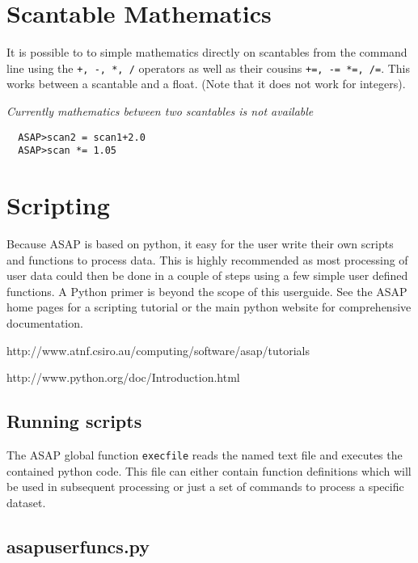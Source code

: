 \documentclass[11pt]{article}
\newcommand{\cmd}[1]{{\tt #1}}
\begin{document}
\section{Scantable Mathematics}

It is possible to to simple mathematics
directly on scantables from the command line using the \cmd{+, -, *,
/} operators as well as their cousins \cmd{+=, -= *=, /=}. This works
between a scantable and a float. (Note that it does
not work for integers).

{\em Currently mathematics between two scantables is not available }

\begin{verbatim}
  ASAP>scan2 = scan1+2.0
  ASAP>scan *= 1.05
\end{verbatim}

\section{Scripting}

Because ASAP is based on python, it easy for the user
write their own scripts and functions to process data. This is highly
recommended as most processing of user data could then be done in a
couple of steps using a few simple user defined functions. A Python
primer is beyond the scope of this userguide. See the ASAP home pages
for a scripting tutorial or the main python website for comprehensive
documentation.

\hspace{1cm} http://www.atnf.csiro.au/computing/software/asap/tutorials

\hspace{1cm} http://www.python.org/doc/Introduction.html

\subsection{Running scripts}

The ASAP global function \cmd{execfile} reads the named text file and
executes the contained python code. This file can either contain
function definitions which will be used in subsequent processing or
just a set of commands to process a specific dataset.

\subsection{asapuserfuncs.py}
\end{document}
